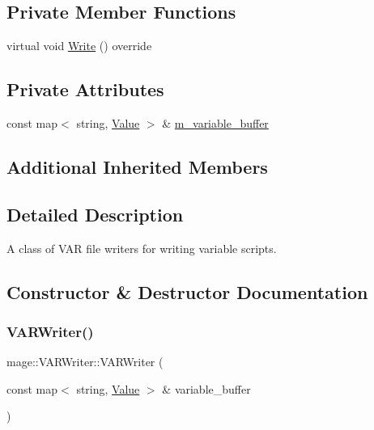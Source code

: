 \subsection*{Private Member Functions}
\begin{DoxyCompactItemize}
\item 
virtual void \hyperlink{classmage_1_1_v_a_r_writer_a964538c6447af667311276745da93d69}{Write} () override
\end{DoxyCompactItemize}
\subsection*{Private Attributes}
\begin{DoxyCompactItemize}
\item 
const map$<$ string, \hyperlink{namespacemage_aa1fe0628487e0706e44efdc62dbdb3a2}{Value} $>$ \& \hyperlink{classmage_1_1_v_a_r_writer_ab8d7fcca1e09b0282a658ae92e405323}{m\+\_\+variable\+\_\+buffer}
\end{DoxyCompactItemize}
\subsection*{Additional Inherited Members}


\subsection{Detailed Description}
A class of V\+AR file writers for writing variable scripts. 

\subsection{Constructor \& Destructor Documentation}
\hypertarget{classmage_1_1_v_a_r_writer_a30f4311d6619f27984913445edb11cd0}{}\label{classmage_1_1_v_a_r_writer_a30f4311d6619f27984913445edb11cd0} 
\subsubsection{\texorpdfstring{V\+A\+R\+Writer()}{VARWriter()}\hspace{0.1cm}{\footnotesize\ttfamily [1/3]}}
{\footnotesize\ttfamily mage\+::\+V\+A\+R\+Writer\+::\+V\+A\+R\+Writer (\begin{DoxyParamCaption}\item[{const map$<$ string, \hyperlink{namespacemage_aa1fe0628487e0706e44efdc62dbdb3a2}{Value} $>$ \&}]{variable\+\_\+buffer }\end{DoxyParamCaption})\hspace{0.3cm}{\ttfamily [explicit]}}

